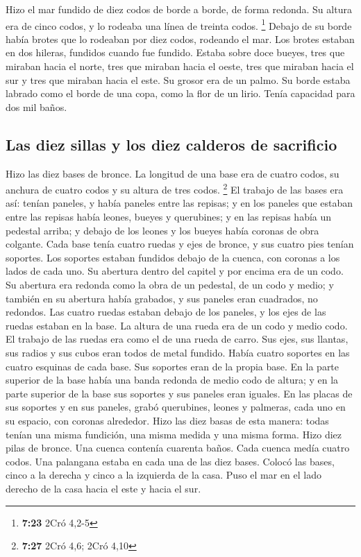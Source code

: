  Hizo el mar fundido de diez codos de borde a borde, de
forma redonda. Su altura era de cinco codos, y lo rodeaba una línea de
treinta codos. \footnote{\textbf{7:23} 2Cró 4,2-5} 
Debajo de su borde había brotes que lo rodeaban por diez codos, rodeando
el mar. Los brotes estaban en dos hileras, fundidos cuando fue fundido.
 Estaba sobre doce bueyes, tres que miraban hacia el
norte, tres que miraban hacia el oeste, tres que miraban hacia el sur y
tres que miraban hacia el este.  Su grosor era de un
palmo. Su borde estaba labrado como el borde de una copa, como la flor
de un lirio. Tenía capacidad para dos mil baños.

\hypertarget{las-diez-sillas-y-los-diez-calderos-de-sacrificio}{%
\subsection{Las diez sillas y los diez calderos de
sacrificio}\label{las-diez-sillas-y-los-diez-calderos-de-sacrificio}}

 Hizo las diez bases de bronce. La longitud de una base
era de cuatro codos, su anchura de cuatro codos y su altura de tres
codos. \footnote{\textbf{7:27} 2Cró 4,6; 2Cró 4,10}  El
trabajo de las bases era así: tenían paneles, y había paneles entre las
repisas;  y en los paneles que estaban entre las repisas
había leones, bueyes y querubines; y en las repisas había un pedestal
arriba; y debajo de los leones y los bueyes había coronas de obra
colgante.  Cada base tenía cuatro ruedas y ejes de
bronce, y sus cuatro pies tenían soportes. Los soportes estaban fundidos
debajo de la cuenca, con coronas a los lados de cada uno.
 Su abertura dentro del capitel y por encima era de un
codo. Su abertura era redonda como la obra de un pedestal, de un codo y
medio; y también en su abertura había grabados, y sus paneles eran
cuadrados, no redondos.  Las cuatro ruedas estaban debajo
de los paneles, y los ejes de las ruedas estaban en la base. La altura
de una rueda era de un codo y medio codo.  El trabajo de
las ruedas era como el de una rueda de carro. Sus ejes, sus llantas, sus
radios y sus cubos eran todos de metal fundido.  Había
cuatro soportes en las cuatro esquinas de cada base. Sus soportes eran
de la propia base.  En la parte superior de la base había
una banda redonda de medio codo de altura; y en la parte superior de la
base sus soportes y sus paneles eran iguales.  En las
placas de sus soportes y en sus paneles, grabó querubines, leones y
palmeras, cada uno en su espacio, con coronas alrededor. 
Hizo las diez basas de esta manera: todas tenían una misma fundición,
una misma medida y una misma forma.  Hizo diez pilas de
bronce. Una cuenca contenía cuarenta baños. Cada cuenca medía cuatro
codos. Una palangana estaba en cada una de las diez bases.
 Colocó las bases, cinco a la derecha y cinco a la
izquierda de la casa. Puso el mar en el lado derecho de la casa hacia el
este y hacia el sur.

